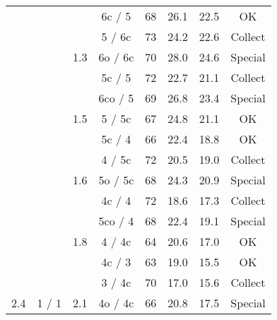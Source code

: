 \begin{tabular}{|c|c|c|c|c|c|c|c|}
 					  & 						& 					    & 6c / 5 & 68 & 26.1 & 22.5 & OK \\
 					  & 					  & 						& {\color[HTML]{FE0000}5 / 6c} & {\color[HTML]{FE0000}73} & {\color[HTML]{FE0000}24.2} & {\color[HTML]{FE0000}22.6} & {\color[HTML]{FE0000}Collect} \\
 					  & 						& \multirow{-3}{*}{1.3} & {\color[HTML]{3166FF}6o / 6c} & {\color[HTML]{3166FF}70} & {\color[HTML]{3166FF}28.0} & {\color[HTML]{3166FF}24.6} & {\color[HTML]{3166FF}Special} \\
\cline{3-8} 
 					  & 					  & 						& {\color[HTML]{FE0000}5c / 5} & {\color[HTML]{FE0000}72} & {\color[HTML]{FE0000}22.7} & {\color[HTML]{FE0000}21.1} & {\color[HTML]{FE0000}Collect} \\
 					  & 					  & 					  & {\color[HTML]{3166FF}6co / 5} & {\color[HTML]{3166FF}69} & {\color[HTML]{3166FF}26.8} & {\color[HTML]{3166FF}23.4} & {\color[HTML]{3166FF}Special} \\
 					  & 					  & \multirow{-3}{*}{1.5} & 5 / 5c & 67 & 24.8 & 21.1 & OK \\
\cline{3-8} 
 					  & 						& 					    & 5c / 4 & 66 & 22.4 & 18.8 & OK \\
 					  & 					  & 						& {\color[HTML]{FE0000}4 / 5c} & {\color[HTML]{FE0000}72} & {\color[HTML]{FE0000}20.5} & {\color[HTML]{FE0000}19.0} & {\color[HTML]{FE0000}Collect} \\
 					  & 						& \multirow{-3}{*}{1.6} & {\color[HTML]{3166FF}5o / 5c} & {\color[HTML]{3166FF}68} & {\color[HTML]{3166FF}24.3} & {\color[HTML]{3166FF}20.9} & {\color[HTML]{3166FF}Special} \\
\cline{3-8} 
 					  & 					  & 						& {\color[HTML]{FE0000}4c / 4} & {\color[HTML]{FE0000}72} & {\color[HTML]{FE0000}18.6} & {\color[HTML]{FE0000}17.3} & {\color[HTML]{FE0000}Collect} \\
 					  & 					  & 					  & {\color[HTML]{3166FF}5co / 4} & {\color[HTML]{3166FF}68} & {\color[HTML]{3166FF}22.4} & {\color[HTML]{3166FF}19.1} & {\color[HTML]{3166FF}Special} \\
 					  & 					  & \multirow{-3}{*}{1.8} & 4 / 4c & 64 & 20.6 & 17.0 & OK \\
\cline{3-8} 
 					  & 					  & 						& 4c / 3 & 63 & 19.0 & 15.5 & OK \\
 					  & 					  & 						& {\color[HTML]{FE0000}3 / 4c} & {\color[HTML]{FE0000}70} & {\color[HTML]{FE0000}17.0} & {\color[HTML]{FE0000}15.6} & {\color[HTML]{FE0000}Collect} \\
\multirow{-15}{*}{2.4} & \multirow{-15}{*}{1 / 1} & \multirow{-3}{*}{2.1} & {\color[HTML]{3166FF}4o / 4c} & {\color[HTML]{3166FF}66} & {\color[HTML]{3166FF}20.8} & {\color[HTML]{3166FF}17.5} & {\color[HTML]{3166FF}Special} \\

\hline
\end{tabular}